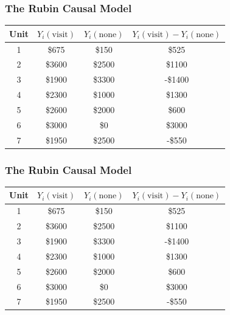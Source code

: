 \documentclass[aspectratio=169]{beamer}
\theoremstyle{principle}
\begin{document}
\begin{frame}
\frametitle{The Rubin Causal Model}
\huge
\begin{table}
\begin{tabular}{ c | c | c | c}
Unit & $Y_i(\mbox{visit})$ & $Y_i(\mbox{none})$ & \color{white}$Y_i(\mbox{visit}) - Y_i(\mbox{none})$ \\
\hline
\hline
  1 & \$675 & \$150 & \color{white}\$525 \\
  2 & \$3600 & \$2500 & \color{white}\$1100\\
  3 & \$1900 & \$3300 & \color{white}-\$1400\\
  4 & \$2300 & \$1000 & \color{white}\$1300\\
  5 & \$2600 & \$2000 & \color{white}\$600\\
  6 & \$3000 & \$0 & \color{white}\$3000\\
  7 & \$1950 & \$2500 & \color{white}-\$550\\
\hline
\hline
\end{tabular}
\end{table}

\end{frame}

\begin{frame}
\frametitle{The Rubin Causal Model}
\huge
\begin{table}
\begin{tabular}{ c | c | c | c}
Unit & $Y_i(\mbox{visit})$ & $Y_i(\mbox{none})$ & $Y_i(\mbox{visit}) - Y_i(\mbox{none})$ \\
\hline
\hline
  1 & \$675 & \$150 & \$525 \\
  2 & \$3600 & \$2500 & \$1100\\
  3 & \$1900 & \$3300 & -\$1400\\
  4 & \$2300 & \$1000 & \$1300\\
  5 & \$2600 & \$2000 & \$600\\
  6 & \$3000 & \$0 & \$3000\\
  7 & \$1950 & \$2500 & -\$550\\
\hline
\hline
\end{tabular}
\end{table}

\end{frame}
\end{document}

